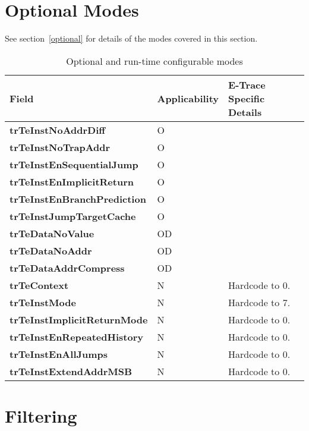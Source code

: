 \section{Optional Modes} \label{sec:ctl-modes}

See section~\ref{optional} for details of the modes covered in this section.

\begin{table}[htp]
  \centering
  \caption{Optional and run-time configurable modes}
  \label{tab:ctl-resync}
  \begin{tabulary}{\textwidth}{|l|l|p{90mm}|}
    \hline
    {\bf Field} & {\bf Applicability} & {\bf E-Trace Specific Details} \\
    \hline
    \textbf{trTeInstNoAddrDiff} & O & \\
    \hline
    \textbf{trTeInstNoTrapAddr} & O & \\
    \hline
    \textbf{trTeInstEnSequentialJump} & O & \\
    \hline
    \textbf{trTeInstEnImplicitReturn} & O & \\
    \hline
    \textbf{trTeInstEnBranchPrediction} & O & \\
    \hline
    \textbf{trTeInstJumpTargetCache} & O & \\
    \hline
    \textbf{trTeDataNoValue} & OD & \\
    \hline
    \textbf{trTeDataNoAddr} & OD & \\
    \hline
    \textbf{trTeDataAddrCompress} & OD & \\
    \hline
    \textbf{trTeContext} & N & Hardcode to 0.\\
    \hline
    \textbf{trTeInstMode} & N & Hardcode to 7.\\
    \hline
    \textbf{trTeInstImplicitReturnMode} & N & Hardcode to 0.\\
    \hline
    \textbf{trTeInstEnRepeatedHistory} & N & Hardcode to 0.\\
    \hline
    \textbf{trTeInstEnAllJumps} & N & Hardcode to 0.\\
    \hline
    \textbf{trTeInstExtendAddrMSB} & N & Hardcode to 0.\\
    \hline
  \end{tabulary}
\end{table}

\section{Filtering} \label{sec:ctl-filter}


